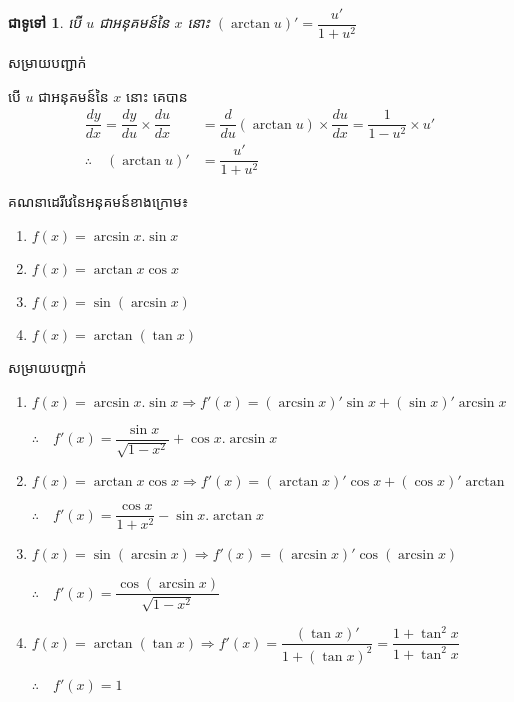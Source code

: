 \documentclass[12pt,fleqn]{book} %
\newtheorem{general}{\kml ជាទូទៅ}
\newcommand{\solution}{{\begin{center}\kml \color{magenta} សម្រាយបញ្ជាក់\end{center} }}
\begin{document}
\begin{general}
បើ $u$ ជាអនុគមន៍នៃ $x$ នោះ $(\arctan u)'=\dfrac{u'}{1+u^2}$
\end{general}
\solution 
បើ $u$ ជាអនុគមន៍នៃ $x$ នោះ  គេបាន 
\begin{align*}
\dfrac{dy}{dx}=\dfrac{dy}{du}\times \dfrac{du}{dx}&=\dfrac{d}{du}(\arctan u)\times \dfrac{du}{dx}=\dfrac{1}{1-u^2}\times u'\\
\therefore \quad (\arctan u)'&=\dfrac{u'}{1+u^2}
\end{align*}
\begin{example}
គណនាដេរីវេនៃអនុគមន៍ខាងក្រោម៖
\begin{multicols}{2}
\begin{enumerate}
\item $f(x)=\arcsin x.\sin x$
\item $f(x)=\arctan x\cos x$
\item $f(x)=\sin (\arcsin x)$
\item $f(x)=\arctan (\tan x)$
\end{enumerate}
\end{multicols}
\end{example}
\solution
\begin{enumerate}
\item $f(x)=\arcsin x.\sin x \Longrightarrow f'(x)=(\arcsin x)'\sin x+(\sin x)'\arcsin x$
\begin{center}
$\therefore \quad f'(x)=\dfrac{\sin x}{\sqrt{1-x^2}}+\cos x.\arcsin x$
\end{center}
\item $f(x)=\arctan x\cos x\Longrightarrow f'(x)=(\arctan x)'\cos x+(\cos x)'\arctan$
\begin{center}
$\therefore \quad f'(x)=\dfrac{\cos x}{1+x^2}-\sin x.\arctan x$
\end{center}
\item $f(x)=\sin (\arcsin x)\Longrightarrow f'(x)=(\arcsin x)'\cos (\arcsin x)$
\begin{center}
$\therefore \quad f'(x)=\dfrac{\cos (\arcsin x)}{\sqrt{1-x^2}}$
\end{center}
\item $f(x)=\arctan (\tan x)\Longrightarrow f'(x)=\dfrac{(\tan x)'}{1+(\tan x)^2}=\dfrac{1+\tan^2 x}{1+\tan^2 x}$
\begin{center}
$\therefore \quad f'(x)=1$
\end{center}
\end{enumerate}
\end{document}
